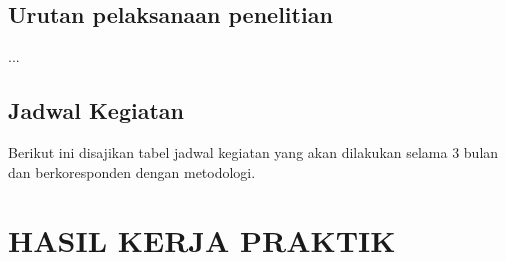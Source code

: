 \documentclass{file/KP-ITS}
\theoremstyle{definition}
\theoremstyle{definition}
\theoremstyle{plain}
\begin{document}
\section{Urutan pelaksanaan penelitian
}
...

\section{Jadwal Kegiatan}
Berikut ini disajikan tabel jadwal kegiatan yang akan dilakukan selama 3 bulan dan berkoresponden dengan metodologi.
		
		


\chapter{HASIL KERJA PRAKTIK}
\end{document}
